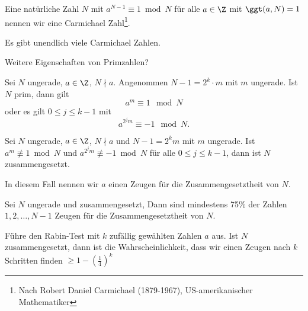 \begin{defn*}
	Eine natürliche Zahl $N$ mit $a^{N-1} \equiv 1 \bmod N$ für alle $a \in \Z$ mit $\ggt(a,N)=1$ nennen wir eine Carmichael Zahl\footnote{Nach Robert Daniel Carmichael (1879-1967), US-amerikanischer Mathematiker}.
\end{defn*}

\begin{thm*}
	Es gibt unendlich viele Carmichael Zahlen.
\end{thm*}

\begin{frage*}
	Weitere Eigenschaften von Primzahlen?
\end{frage*}

\begin{thm}\autolabel\video
	Sei $N$ ungerade, $a \in \Z$, $N \nmid a$. Angenommen $N-1 = 2^k \cdot m$ mit $m$ ungerade. Ist $N$ prim, dann gilt
	\[ a^m \equiv 1 \mod N \]
	oder es gilt $0 \leq j \leq k-1$ mit 
	\[ a^{2^jm} \equiv -1 \mod N. \]
\end{thm}

\begin{thm*}
	Sei $N$ ungerade, $a \in \Z$, $N \nmid a$ und $N-1 = 2^km$ mit $m$ ungerade. Ist $a^m \not\equiv 1 \bmod N$ und $a^{2^jm} \not\equiv -1 \bmod N$ für alle $0 \leq j \leq k-1$, dann ist $N$ zusammengesetzt.
\end{thm*}

\begin{defn*}
	In diesem Fall nennen wir $a$ einen Zeugen für die Zusammengesetztheit von $N$.
\end{defn*}

\begin{thm*}
	Sei $N$ ungerade und zusammengesetzt, Dann sind mindestens 75\% der Zahlen $1,2,\dotsc,N-1$ Zeugen für die Zusammengesetztheit von $N$.
\end{thm*}

\begin{idee*}
	Führe den Rabin-Test mit $k$ zufällig gewählten Zahlen $a$ aus. Ist $N$ zusammengesetzt, dann ist die Wahrscheinlichkeit, dass wir einen Zeugen nach $k$ Schritten finden \( \geq 1 - \left( \frac{1}{4} \right)^k \)
\end{idee*}

